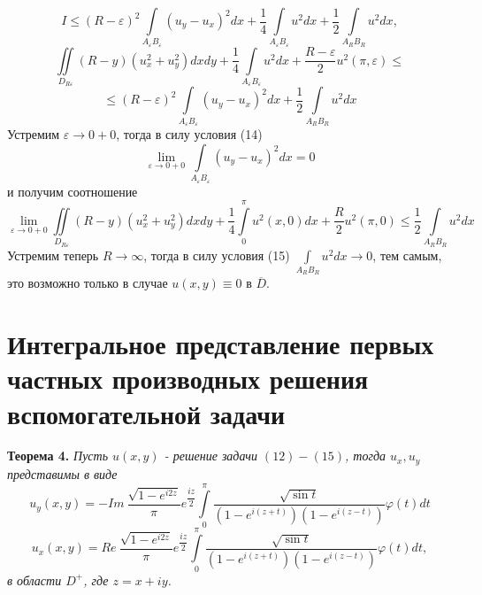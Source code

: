 \documentclass[12pt, a4paper]{article}
\begin{document}
	\begin{equation*}
		I \leq \left(R - \varepsilon\right)^2 \int\limits_{A_\varepsilon B_\varepsilon} \left( u_y - u_x\right)^2 dx + \dfrac14 \int\limits_{A_\varepsilon B_\varepsilon} u^2 dx +\dfrac12 \int\limits_{A_RB_R} u^2 dx, 
	\end{equation*}
	\begin{equation*}
		\iint\limits_{D_{R\varepsilon}} \left(R - y\right) \left(u_x^2 + u_y^2\right) dx dy + \dfrac{1}{4}\int\limits_{A_\varepsilon B_\varepsilon} u^2 dx +\dfrac{R - \varepsilon}{2}u^2(\pi, \varepsilon) \leq 
	\end{equation*}
	\begin{equation*}
		\leq \left(R - \varepsilon\right)^2 \int\limits_{A_\varepsilon B_\varepsilon} \left( u_y - u_x\right)^2 dx  +\dfrac12 \int\limits_{A_RB_R} u^2 dx
	\end{equation*}
	Устремим $\varepsilon \to 0 + 0$, тогда в силу условия (14)
	\begin{equation*}
		\lim\limits_{\varepsilon \to 0 + 0} \int\limits_{A_\varepsilon B_\varepsilon} \left(u_y - u_x\right)^2 dx = 0
	\end{equation*}
	и получим соотношение
	\begin{equation*}
		\lim\limits_{\varepsilon \to 0 + 0} \iint\limits_{D_{R\varepsilon}} \left(R - y\right) \left(u_x^2 + u_y^2 \right) dx dy + \dfrac14 \int\limits_0^\pi u^2(x,0) dx + \dfrac{R}{2}u^2(\pi,0) \leq \dfrac12 \int\limits_{A_RB_R} u^2 dx
	\end{equation*}
	Устремим теперь $R \to \infty$, тогда  в силу условия (15) $\int\limits_{A_RB_R} u^2 dx \to 0$, тем самым, это возможно только в случае $u(x,y) \equiv 0$ в $\overline{D}$.
\section{Интегральное представление первых частных производных решения вспомогательной задачи}
\textbf{Теорема 4.} \textit{	Пусть $u(x,y)$ - решение задачи $(12)-(15)$, тогда $u_x, u_y$ представимы в виде
	\begin{equation}
		u_y(x,y) = - Im\  \dfrac{ \sqrt{1 - e^{i2z}} }{\pi} e^{\dfrac{iz}{2}} \int\limits_0^\pi  \dfrac{\sqrt{\sin{t}}}{\left(1 - e^{i(z+t)} \right) \left(1 - e^{i(z-t)}\right)}  \varphi(t) dt
	\end{equation}
	\begin{equation}
		u_x(x,y) = Re\   \dfrac{ \sqrt{1 - e^{i2z}} }{\pi} e^{\dfrac{iz}{2}} \int\limits_0^\pi  \dfrac{\sqrt{\sin{t}}}{\left(1 - e^{i(z+t)} \right) \left(1 - e^{i(z-t)}\right)}  \varphi(t) dt,
\end{equation} 
в области $D^+$, где $z = x + iy$.}
\end{document}
